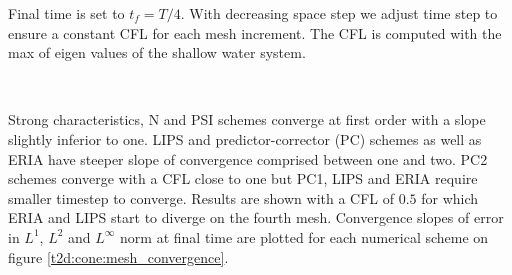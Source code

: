 Final time is set to $t_f=T/4$.
With decreasing space step we adjust time step to ensure a constant CFL for each mesh increment.
The CFL is computed with the max of eigen values of the shallow water system.

\

Strong characteristics, N and PSI schemes converge at first order with a slope slightly inferior to one.
LIPS and predictor-corrector (PC) schemes as well as ERIA have steeper slope of convergence comprised 
between one and two. PC2 schemes converge with a CFL close to one but PC1, LIPS and ERIA require smaller 
timestep to converge. Results are shown with a CFL of $0.5$ for which ERIA and LIPS start to diverge on  the
fourth mesh.
Convergence slopes of error in $L^1$, $L^2$ and $L^\infty$ norm at final time
are plotted for each numerical scheme on figure \ref{t2d:cone:mesh_convergence}.


